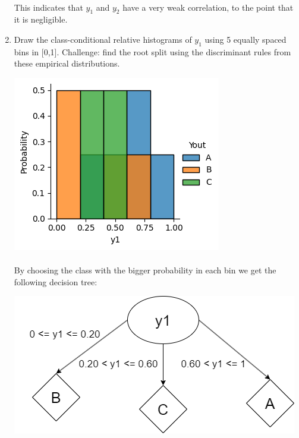 \documentclass[12pt]{article}
\begin{document}
\begin{enumerate}[leftmargin=\labelsep]
    \paragraph{}This indicates that $y_1$ and $y_2$ have a very weak correlation, to the point that it is negligible.

    \item Draw the class-conditional relative histograms of $y_1$ using 5 equally spaced bins in [0,1].
    Challenge: find the root split using the discriminant rules from these empirical distributions.    

    \begin{center}
        \includegraphics[scale=1]{images/histogram.png}
    \end{center}

    \paragraph{} By choosing the class with the bigger probability in each bin we get the following decision tree:

    \begin{center}
        \includegraphics[scale=0.5]{images/small-decision-tree.png}
    \end{center}

\end{enumerate}
\end{document}
